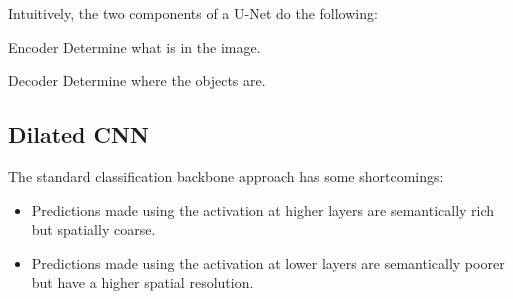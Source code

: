 \begin{description}
        \begin{remark}
            Intuitively, the two components of a U-Net do the following:
            \begin{descriptionlist}
                \item[Encoder] Determine what is in the image.
                \item[Decoder] Determine where the objects are.
            \end{descriptionlist}
        \end{remark}
\end{description}


\subsection{Dilated CNN}

\begin{remark}
    The standard classification backbone approach has some shortcomings:
    \begin{itemize}
        \item Predictions made using the activation at higher layers are semantically rich but spatially coarse.
        \item Predictions made using the activation at lower layers are semantically poorer but have a higher spatial resolution.
    \end{itemize}
\end{remark}

